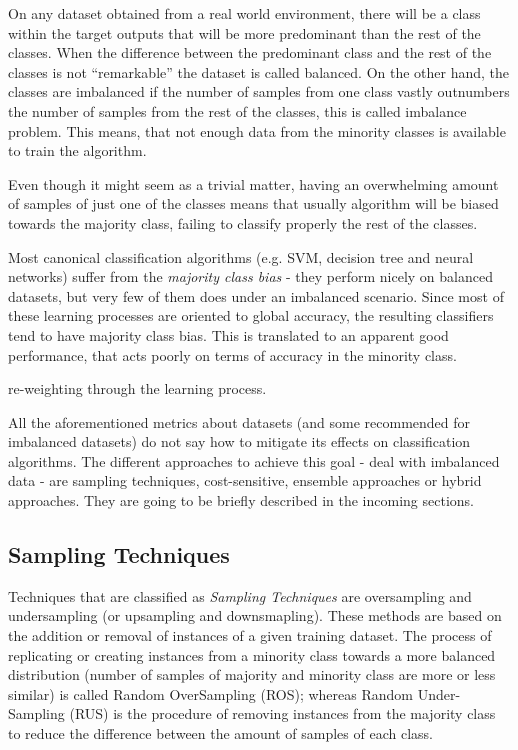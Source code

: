 On any dataset obtained from a real world environment, there will be a class 
within the target outputs that will be more predominant than the rest of the 
classes. When the difference between the predominant class and the rest of the 
classes is not ``remarkable'' the dataset is called balanced. On the other hand, 
the classes are imbalanced if the number of samples from one class vastly 
outnumbers the number of samples from the rest of the classes, this is called 
 imbalance problem. This means, that not enough data from the minority classes 
 is available to train the algorithm.

Even though it might seem as a trivial matter, having an overwhelming 
amount of samples of just one of the classes means that usually algorithm will 
be biased towards the majority class, failing to classify properly the rest of 
the classes. 

Most canonical classification algorithms (e.g. SVM, decision tree and neural
networks) suffer from the \textit{majority class bias} - they perform nicely on
balanced datasets, but very few of them does under an imbalanced scenario. 
Since most of these learning processes are oriented to global accuracy, the 
resulting classifiers tend to have majority class bias. This is translated to 
an apparent good performance, that acts poorly on terms of accuracy in the 
minority class.

re-weighting through the learning process.

All the aforementioned metrics about datasets (and some recommended for 
imbalanced datasets) do not say how to mitigate its effects on classification 
algorithms. The different approaches to achieve this goal - deal with imbalanced 
data - are sampling techniques, cost-sensitive, ensemble approaches or hybrid
approaches. They are going to be briefly described in the incoming sections.

\subsection{Sampling Techniques}
\label{subsec:samlpingTech}

Techniques that are classified as \textit{Sampling Techniques} are oversampling 
and undersampling (or upsampling and downsmapling). These methods are based on 
the addition or removal of instances of a given training dataset. The process of
replicating or creating instances from a minority class towards a more balanced
distribution (number of samples of majority and minority class are more or less
similar) is called Random OverSampling (ROS); whereas Random Under-Sampling 
(RUS) is the procedure of removing instances from the majority class to reduce 
the difference between the amount of samples of each class.

